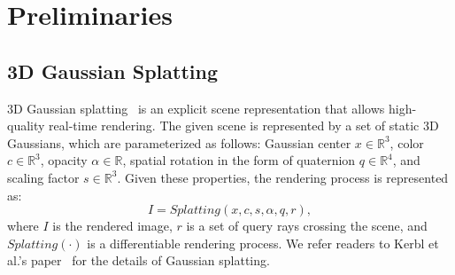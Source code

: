 

\section{Preliminaries }
\label{sec:Preliminaries}

\subsection{3D Gaussian Splatting}
3D Gaussian splatting~\cite{kerbl3Dgaussians} is an explicit scene representation that allows high-quality real-time rendering. The given scene is represented by a set of static 3D Gaussians, which are parameterized as follows: Gaussian center $x\in {\mathbb{R}^3}$, color $c\in {\mathbb{R}^3}$, opacity $\alpha\in {\mathbb{R}}$, spatial rotation in the form of quaternion $q\in {\mathbb{R}^4}$, and scaling factor $s\in {\mathbb{R}^3}$. Given these properties, the rendering process is represented as:
\begin{equation}
  I = Splatting(x, c, s, \alpha, q, r),
  \label{eq:splattingGA}
\end{equation}
where $I$ is the rendered image, $r$ is a set of query rays crossing the scene, and $Splatting(\cdot)$ is a differentiable rendering process. We refer readers to Kerbl et al.'s paper~\cite{kerbl3Dgaussians} for the details of Gaussian splatting. 



 
